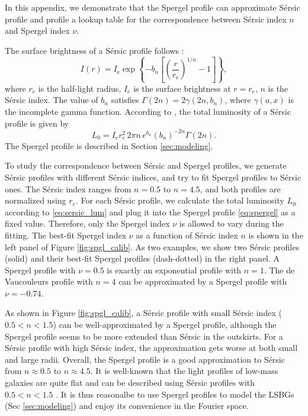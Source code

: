 \documentclass[twocolumn,astrosymb,twocolappendix]{aastex631}
\newcommand{\sersic}{S\'ersic}
\begin{document}
\begin{CJK*}{UTF8}{gbsn}
In this appendix, we demonstrate that the Spergel profile can approximate \sersic{} profile and profile a lookup table for the correspondence between \sersic{} index $n$ and Spergel index $\nu$.

The surface brightness of a \sersic{} profile follows \citep{Sersic1963,Graham2005}:
\begin{equation}\label{eq:sersic}
    I(r)=I_{\mathrm{e}} \exp \left\{-b_{n}\left[\left(\frac{r}{r_{\mathrm{e}}}\right)^{1 / n}-1\right]\right\},
\end{equation}
where $r_e$ is the half-light radius, $I_e$ is the surface brightness at $r=r_e$, $n$ is the \sersic{} index. The value of $b_n$ satisfies $\Gamma(2 n)=2 \gamma\left(2 n, b_{n}\right)$, where $\gamma(a, x)$ is the incomplete gamma function. According to \citet{Graham2005}, the total luminosity of a \sersic{} profile is given by 
\begin{equation}\label{eq:sersic_lum}
    L_0 = I_{e} r_{e}^{2}\, 2 \pi n\, e^{b_{n}} \left(b_{n}\right)^{-2 n} \Gamma(2 n).
\end{equation}
The Spergel profile is described in Section \ref{sec:modeling}. 

To study the correspondence between \sersic{} and Spergel profiles, we generate \sersic{} profiles with different \sersic{} indices, and try to fit Spergel profiles to \sersic{} ones. The \sersic{} index ranges from $n=0.5$ to $n=4.5$, and both profiles are normalized using $r_e$. For each \sersic{} profile, we calculate the total luminosity $L_0$ according to \eqref{eq:sersic_lum} and plug it into the Spergel profile \eqref{eq:spergel} as a fixed value. Therefore, only the Spergel index $\nu$ is allowed to vary during the fitting. The best-fit Spergel index $\nu$ as a function of \sersic{} index $n$ is shown in the left panel of Figure \ref{fig:spgl_calib}. As two examples, we show two \sersic{} profiles (solid) and their best-fit Spergel profiles (dash-dotted) in the right panel. A Spergel profile with $\nu=0.5$ is exactly an exponential profile with $n=1$. The de Vaucouleurs profile \citep{deVaucouleurs1948} with $n=4$ can be approximated by a Spergel profile with $\nu=-0.74$. 

As shown in Figure \ref{fig:spgl_calib}, a \sersic{} profile with small \sersic{} index ($0.5 < n < 1.5$) can be well-approximated by a Spergel profile, although the Spergel profile seems to be more extended than \sersic{} in the outskirts. For a \sersic{} profile with high \sersic{} index, the approximation gets worse at both small and large radii. Overall, the Spergel profile is a good approximation to \sersic{} from $n\approx 0.5$ to $n\approx 4.5$. It is well-known that the light profiles of low-mass galaxies are quite flat and can be described using \sersic{} profiles with $0.5 < n < 1.5$ \citep[e.g.,][]{vanDokkum2015,Lange2015,Greco2018,Zaritsky2021,ELVES-I}. It is thus reasonalbe to use Spergel profiles to model the LSBGs (Sec \ref{sec:modeling}) and enjoy its convenience in the Fourier space. 




\end{CJK*}
\end{document}
